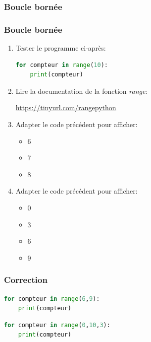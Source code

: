 \documentclass[svgnames,11pt]{beamer}
\begin{document}
\subsubsection{Boucle bornée}
\begin{frame}[fragile]
    \frametitle{Boucle bornée}

    \begin{activite}
    \begin{enumerate}
    \item Tester le programme ci-après:
    \begin{lstlisting}[language=Python , basicstyle=\ttfamily\small, xleftmargin=1em, xrightmargin=1em]
for compteur in range(10):
    print(compteur)
\end{lstlisting}
    \item Lire la documentation de la fonction \emph{range}:
    \begin{center}
    \url{https://tinyurl.com/rangepython}
    \end{center}
    \item Adapter le code précédent pour afficher:
    \begin{itemize}
    \item 6
    \item 7
    \item 8
    \end{itemize}
    \item Adapter le code précédent pour afficher:
    \begin{itemize}
    \item 0
    \item 3
    \item 6
    \item 9
    \end{itemize}
\end{enumerate}
\end{activite}
\end{frame}
\begin{frame}[fragile]
    \frametitle{Correction}

\begin{center}
\begin{lstlisting}[language=Python , basicstyle=\ttfamily\small, xleftmargin=2em, xrightmargin=2em]
for compteur in range(6,9):
    print(compteur)
\end{lstlisting}
\end{center}   
\begin{center}
\begin{lstlisting}[language=Python , basicstyle=\ttfamily\small, xleftmargin=2em, xrightmargin=2em]
for compteur in range(0,10,3):
    print(compteur)
\end{lstlisting}
\end{center}
\end{frame}
\end{document}

